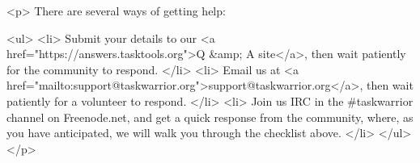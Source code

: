 \documentclass[t,handout]{beamer}
\begin{document}
<p>
  There are several ways of getting help:

  <ul>
    <li>
      Submit your details to our
      <a href="https://answers.tasktools.org">Q &amp; A site</a>,
      then wait patiently for the community to respond.
    </li>
    <li>
      Email us at
      <a href="mailto:support@taskwarrior.org">support@taskwarrior.org</a>,
      then wait patiently for a volunteer to respond.
    </li>
    <li>
      Join us IRC in the #taskwarrior channel on Freenode.net, and
      get a quick response from the community, where, as you have
      anticipated, we will walk you through the checklist above.
    </li>
  </ul>
</p>

\end{document}

